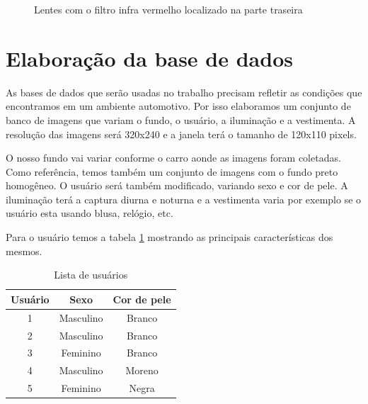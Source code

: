 \begin{figure}[ht!]
	\centering
	\setlength{\fboxsep}{1pt}
  	\caption{Lentes com o filtro infra vermelho localizado na parte traseira}
  	\label{fig:camera_02}
\end{figure}

\section{Elaboração da base de dados}

As bases de dados que serão usadas no trabalho precisam refletir as condições que encontramos em um ambiente automotivo. Por isso elaboramos um conjunto de banco de imagens que variam o fundo, o usuário, a iluminação e a vestimenta. A resolução das imagens será 320x240 e a janela terá o tamanho de 120x110 pixels.

O nosso fundo vai variar conforme o carro aonde as imagens foram coletadas. Como referência, temos também um conjunto de imagens com o fundo preto homogêneo.
O usuário será também modificado, variando sexo e cor de pele. A iluminação terá a captura diurna e noturna e a vestimenta varia por exemplo se o usuário esta usando blusa, relógio, etc.

Para o usuário temos a tabela \ref{table:usuarios} mostrando as principais características dos mesmos.

\begin{table}[h]
	\centering
	\begin{tabular}{|c|c|c|}
		\hline Usuário & Sexo & Cor de pele \\
		\hline 1 & Masculino & Branco \\
		\hline 2 & Masculino & Branco \\
		\hline 3 & Feminino & Branco \\
		\hline 4 & Masculino & Moreno \\
		\hline 5 & Feminino & Negra \\
		\hline
	\end{tabular}
	\caption{Lista de usuários}
	\label{table:usuarios}
\end{table}


